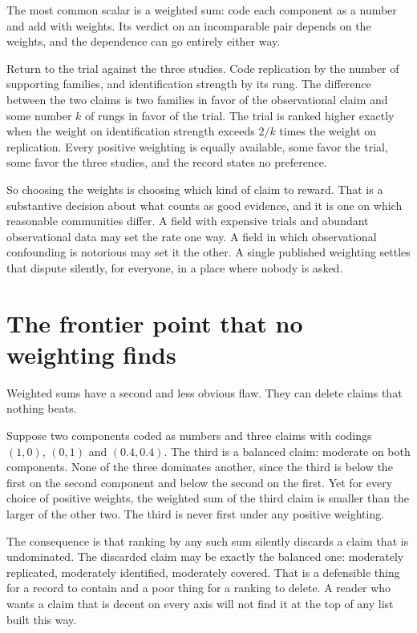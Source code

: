 \documentclass[11pt]{article}
\begin{document}
The most common scalar is a weighted sum: code each component as a number and add with weights. Its verdict on an incomparable pair depends on the weights, and the dependence can go entirely either way.

Return to the trial against the three studies. Code replication by the number of supporting families, and identification strength by its rung. The difference between the two claims is two families in favor of the observational claim and some number $k$ of rungs in favor of the trial. The trial is ranked higher exactly when the weight on identification strength exceeds $2/k$ times the weight on replication. Every positive weighting is equally available, some favor the trial, some favor the three studies, and the record states no preference.

So choosing the weights is choosing which kind of claim to reward. That is a substantive decision about what counts as good evidence, and it is one on which reasonable communities differ. A field with expensive trials and abundant observational data may set the rate one way. A field in which observational confounding is notorious may set it the other. A single published weighting settles that dispute silently, for everyone, in a place where nobody is asked.

\section{The frontier point that no weighting finds}\label{sec:nonconvex}

Weighted sums have a second and less obvious flaw. They can delete claims that nothing beats.

Suppose two components coded as numbers and three claims with codings $(1,0)$, $(0,1)$ and $(0.4,0.4)$. The third is a balanced claim: moderate on both components. None of the three dominates another, since the third is below the first on the second component and below the second on the first. Yet for every choice of positive weights, the weighted sum of the third claim is smaller than the larger of the other two. The third is never first under any positive weighting.

The consequence is that ranking by any such sum silently discards a claim that is undominated. The discarded claim may be exactly the balanced one: moderately replicated, moderately identified, moderately covered. That is a defensible thing for a record to contain and a poor thing for a ranking to delete. A reader who wants a claim that is decent on every axis will not find it at the top of any list built this way.
\end{document}
